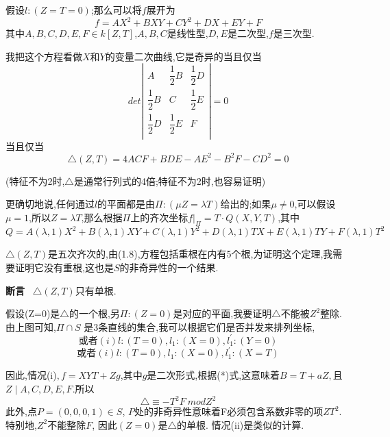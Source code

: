 \documentclass[UTF8]{book}
\begin{document}
	假设$l:(Z=T=0)$;那么可以将$ f $展开为
	\begin{equation*}
	f=AX^{2}+BXY+CY^{2}+DX+EY+F \tag{$*$}
	\end{equation*}
	其中$A,B,C,D,E,F\in k[Z,T]$,$ A,B,C $是线性型,$ D,E $是二次型,$ f $是三次型.
	
	我把这个方程看做$ X $和$ Y $的变量二次曲线,它是奇异的当且仅当
	\begin{equation*}
	det\left|\begin{array}{ccc}
	A &  \dfrac{1}{2}B & \dfrac{1}{2} D\\
	\dfrac{1}{2}B & C &  \dfrac{1}{2} E \\
	\dfrac{1}{2} D & \dfrac{1}{2} E &  F\\
	
	\end{array}\right|=0
	\end{equation*}
	当且仅当
	\begin{equation*}
	\bigtriangleup(Z,T)
	=4ACF+BDE-AE^{2}-B^{2}F-CD^{2}=0
	\end{equation*}
	
	(特征不为2时,$\bigtriangleup$是通常行列式的4倍;特征不为2时,也容易证明)
	
	更确切地说,任何通过$l$的平面都是由$\Pi:(\mu Z=\lambda T)$给出的;如果$\mu \neq 0$,可以假设$\mu=1$,所以$Z=\lambda T$,那么根据$\Pi$上的齐次坐标$f|_{\Pi}=T \cdot Q(X,Y,T)$,其中
	\begin{equation*}
	Q=A(\lambda,1)X^{2}+B(\lambda,1)XY+C(\lambda,1)Y^{2}+D(\lambda,1)TX+E(\lambda,1)TY+F(\lambda,1)T^{2}
	\end{equation*}
	
	$\bigtriangleup(Z,T)$是五次齐次的,由(1.8),方程包括重根在内有5个根,为证明这个定理,我需要证明它没有重根,这也是$ S $的非奇异性的一个结果.
	
	\textbf{断言} \ $\bigtriangleup(Z,T)$只有单根.
	
	假设(Z=0)是$\bigtriangleup$的一个根,另$\Pi:(Z=0)$是对应的平面,我要证明$\bigtriangleup$不能被$Z^{2}$整除.由上图可知,$\Pi \cap S$ 是3条直线的集合,我可以根据它们是否并发来排列坐标,
	\begin{equation*}
	\text{或者}(i)l:(T=0),l_{1}:(X=0),l^{'}_{1}:(Y=0)
	\end{equation*}
	\begin{equation*}
	\text{或者}(i)l:(T=0),l_{1}:(X=0),l^{'}_{1}:(X=T)
	\end{equation*}
	
	因此,情况(i)$ ,f=XYT+Zg $,其中$ g $是二次形式,根据(*)式,这意味着$ B=T+aZ, $且$Z\mid A,C,D,E,F$.所以
	\begin{equation*}
	\bigtriangleup \equiv -T^{2}F \ mod Z^{2}
	\end{equation*}
	此外,点$P = (0,0,0,1)\in S$, $ P $处的非奇异性意味着F必须包含系数非零的项$ZT^{2}$. 特别地,$Z^{2}$不能整除$ F $, 因此$ (Z = 0) $是$\bigtriangleup$的单根.
	情况(ii)是类似的计算.
	
\end{document}
